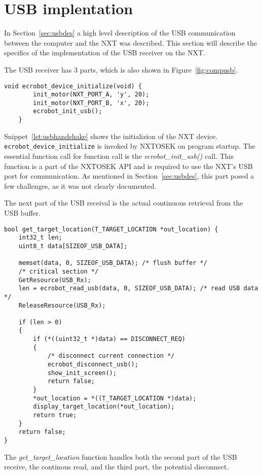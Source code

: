 \section{USB implentation}
\label{sec:usbimp}
In Section~\ref{sec:usbdes} a high level description of the USB communication between the computer and the NXT was described.
This section will describe the specifics of the implementation of the USB receiver on the NXT.

The USB receiver has 3 parts, which is also shown in Figure~\ref{fig:compusb}.

\begin{lstlisting}[language=CSharp,label={lst:usbhandshake},caption={ecrobot\_device\_initialize method from nxt.c}]
    void ecrobot_device_initialize(void) {
        init_motor(NXT_PORT_A, 'y', 20);
        init_motor(NXT_PORT_B, 'x', 20);
        ecrobot_init_usb();
    }
\end{lstlisting}
Snippet~\ref{lst:usbhandshake} shows the initializion of the NXT device. 
\texttt{ecrobot\_device\_initialize} is invoked by NXTOSEK on program startup.
The essential function call for function call is the \textit{ecrobot\_init\_usb()} call.
This function is a part of the NXTOSEK API and is required to use the NXT's USB port for communication.
As mentioned in Section~\ref{sec:usbdes}, this part posed a few challenges, as it was not clearly documented.

The next part of the USB receival is the actual continuous retrieval from the USB buffer.
\begin{lstlisting}[language=CSharp,label={lst:usbreceive},caption={get\_target\_location method from data\_receive.c}]
    bool get_target_location(T_TARGET_LOCATION *out_location) {
	int32_t len;
	uint8_t data[SIZEOF_USB_DATA];

    memset(data, 0, SIZEOF_USB_DATA); /* flush buffer */
	/* critical section */
	GetResource(USB_Rx);
	len = ecrobot_read_usb(data, 0, SIZEOF_USB_DATA); /* read USB data */
	ReleaseResource(USB_Rx);

	if (len > 0)
	{
		if (*((uint32_t *)data) == DISCONNECT_REQ)
		{
			/* disconnect current connection */
			ecrobot_disconnect_usb();
			show_init_screen();
			return false;
		}
		*out_location = *((T_TARGET_LOCATION *)data);
		display_target_location(*out_location);
		return true;
	}
	return false;
}
\end{lstlisting}
The \textit{get\_target\_location} function handles both the second part of the USB receive, the continous read, and the third part, the potential disconnect.

